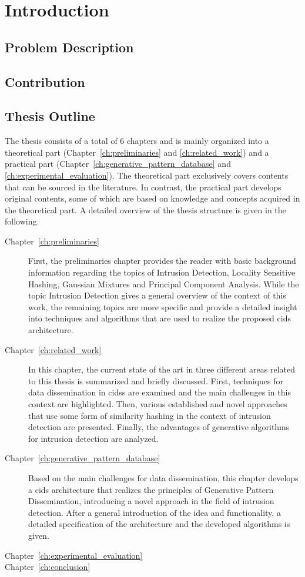 \documentclass[../../main.tex]{subfiles}
\begin{document}
\chapter{Introduction}

\section{Problem Description}

\section{Contribution}

\section{Thesis Outline}

The thesis consists of a total of 6 chapters and is mainly organized into a theoretical part (Chapter~\ref{ch:preliminaries} and \ref{ch:related_work}) and a practical part (Chapter~\ref{ch:generative_pattern_database} and \ref{ch:experimental_evaluation}). The theoretical part exclusively covers contents that can be sourced in the literature. In contrast, the practical part develops original contents, some of which are based on knowledge and concepts acquired in the theoretical part. A detailed overview of the thesis structure is given in the following.

\begin{description}
    \item[Chapter~\ref{ch:preliminaries}] First, the preliminaries chapter provides the reader with basic background information regarding the topics of Intrusion Detection, Locality Sensitive Hashing, Gaussian Mixtures and Principal Component Analysis. While the topic Intrusion Detection gives a general overview of the context of this work, the remaining topics are more specific and provide a detailed insight into techniques and algorithms that are used to realize the proposed \acrshort{cids} architecture.
    \item[Chapter~\ref{ch:related_work}] In this chapter, the current state of the art in three different areas related to this thesis is summarized and briefly discussed. First, techniques for data dissemination in \glspl{cids} are examined and the main challenges in this context are highlighted. Then, various established and novel approaches that use some form of similarity hashing in the context of intrusion detection are presented. Finally, the advantages of generative algorithms for intrusion detection are analyzed.
    \item[Chapter~\ref{ch:generative_pattern_database}] Based on the main challenges for data dissemination, this chapter develops a \gls{cids} architecture that realizes the principles of Generative Pattern Dissemination, introducing a novel approach in the field of intrusion detection. After a general introduction of the idea and functionality, a detailed specification of the architecture and the developed algorithms is given.
    \item[Chapter~\ref{ch:experimental_evaluation}]
    \item[Chapter~\ref{ch:conclusion}]    
\end{description}
\end{document}
